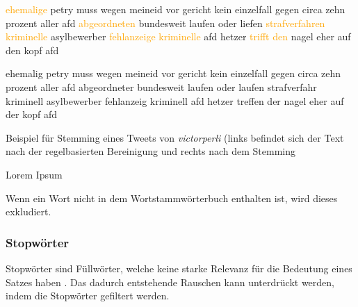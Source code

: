 \begin{code}[H]
    \begin{minipage}{0.45\textwidth}
        \small
        \textcolor{orange}{ehemalige} petry muss wegen meineid vor gericht kein einzelfall gegen circa zehn prozent aller afd \textcolor{orange}{abgeordneten} bundesweit laufen oder liefen \textcolor{orange}{strafverfahren} \textcolor{orange}{kriminelle} asylbewerber \textcolor{orange}{fehlanzeige} \textcolor{orange}{kriminelle} afd hetzer \textcolor{orange}{trifft} \textcolor{orange}{den} nagel eher auf den kopf afd
    \end{minipage}\hfill
    \begin{minipage}{0.45\textwidth}
        \small
        ehemalig petry muss wegen meineid vor gericht kein einzelfall gegen circa zehn prozent aller afd abgeordneter bundesweit laufen oder laufen strafverfahr kriminell asylbewerber fehlanzeig kriminell afd hetzer treffen der nagel eher auf der kopf afd
    \end{minipage}\hfill
    \caption[Beispiel -- Stemming]{Beispiel für Stemming eines Tweets von \textit{victorperli} (links befindet sich der Text nach der regelbasierten Bereinigung und rechts nach dem Stemming} \label{list:stemming}
\end{code}

Lorem Ipsum

Wenn ein Wort nicht in dem Wortstammwörterbuch enthalten ist, wird dieses exkludiert.

\subsubsection{Stopwörter}


Stopwörter sind Füllwörter, welche keine starke Relevanz für die Bedeutung eines Satzes haben \autocite[4]{kowsari_text_2019}. Das dadurch entstehende Rauschen kann unterdrückt werden, indem die Stopwörter gefiltert werden.


